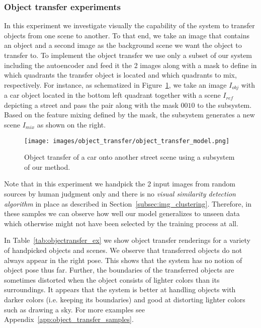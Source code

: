 \documentclass[12pt,a4paper]{article}
\begin{document}
\subsubsection{Object transfer experiments}\label{subsubsec:objTransfExp}
In this experiment we investigate visually the capability of the system to transfer objects from one scene to another. To that end, we take an image that contains an object and a second image as the background scene we want the object to transfer to. To implement the object transfer we use only a subset of our system including the autoencoder and feed it the 2 images along with a mask to define in which quadrants the transfer object is located and which quadrants to mix, respectively. For instance, as schematized in Figure~\ref{fig:objectransfer_arch}, we take an image $I_{obj}$ with a car object located in the bottom left quadrant together with a scene $I_{ref}$ depicting a street and pass the pair along with the mask $0010$ to the subsystem. Based on the feature mixing defined by the mask, the subsystem generates a new scene $I_{mix}$ as shown on the right.
\begin{figure}[ht]
\centering
\texttt{[image: images/object\_transfer/object\_transfer\_model.png]}
\caption{Object transfer of a car onto another street scene using a subsystem of our method.}
\label{fig:objectransfer_arch}
\end{figure}
Note that in this experiment we handpick the 2 input images from random sources by human judgment only and there is no \textit{visual similarity detection algorithm} in place as described in Section~\ref{subsec:img_clustering}. Therefore, in these samples we can observe how well our model generalizes to unseen data which otherwise might not have been selected by the training process at all.

In Table~\ref{tab:objectransfer_ex} we show object transfer renderings for a variety of handpicked objects and scenes. We observe that transferred objects do not always appear in the right pose. This shows that the system has no notion of object pose thus far. Further, the boundaries of the transferred objects are sometimes distorted when the object consists of lighter colors than its surroundings. It appears that the system is better at handling objects with darker colors (i.e. keeping its boundaries) and good at distorting lighter colors such as drawing a sky. For more examples see Appendix~\ref{app:object_transfer_samples}.

\end{document}
